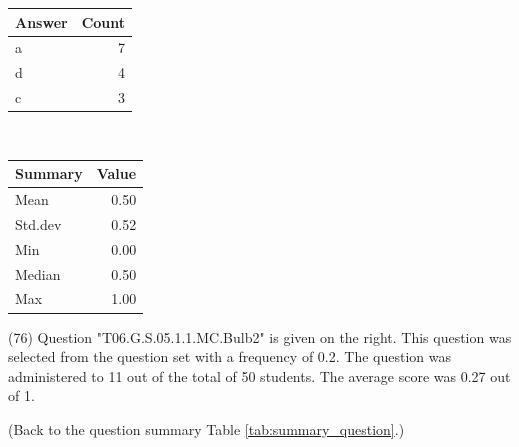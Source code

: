 \documentclass[12pt,english,nohyper]{tufte-handout}\usepackage[]{graphicx}\usepackage[]{color}
\begin{document}
\begin{center}%
\begin{tabular}{lr}
  \hline
Answer & Count \\ 
  \hline
a &   7 \\ 
  d &   4 \\ 
  c &   3 \\ 
   \hline
\end{tabular}
~~~~~~~~%
\begin{tabular}{lr}
  \hline
Summary & Value \\ 
  \hline
Mean & 0.50 \\ 
  Std.dev & 0.52 \\ 
  Min & 0.00 \\ 
  Median & 0.50 \\ 
  Max & 1.00 \\ 
   \hline
\end{tabular}
\end{center}\newpage{} (76) Question "T06.G.S.05.1.1.MC.Bulb2" is given on the right. This question was selected from the question set with a frequency of 0.2. The question was administered to 11 out of the total of 50 students. The average score was 0.27 out of 1.

 (Back to the question summary Table \ref{tab:summary_question}.)
\end{document}
